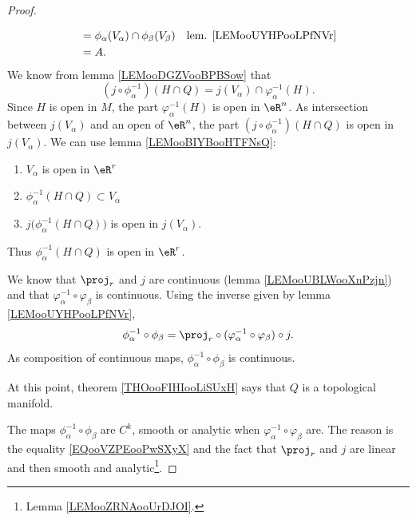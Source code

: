\begin{proof}
\begin{subproof}
\begin{subproof}
\begin{subequations}
\begin{align}
					        & =\phi_{\alpha}(V_{\alpha})\cap\phi_{\beta}(V_{\beta})                                                  & \text{lem. \ref{LEMooUYHPooLPfNVr}} \\
					        & =A.
				\end{align}
			\end{subequations}
			We know from lemma \ref{LEMooDGZVooBPBSow} that
			\begin{equation}
				(j\circ\phi_{\alpha}^{-1})(H\cap Q)=j(V_{\alpha})\cap\varphi_{\alpha}^{-1}(H).
			\end{equation}
			Since \( H\) is open in \( M\), the part \( \varphi_{\alpha}^{-1}(H)\) is open in \( \eR^n\). As intersection between \( j(V_{\alpha})\) and an open of \( \eR^n\), the part \( (j\circ\phi_{\alpha}^{-1})(H\cap Q)\) is open in \( j(V_{\alpha})\). We can use lemma \ref{LEMooBIYBooHTFNsQ}:
			\begin{enumerate}
				\item
				      \( V_{\alpha}\) is open in \( \eR^r\)
				\item
				      \( \phi_{\alpha}^{-1}(H\cap Q)\subset V_{\alpha}\)
				\item
				      \( j\big( \phi_{\alpha}^{-1}(H\cap Q) \big)\) is open in \( j(V_{\alpha})\).
			\end{enumerate}
			Thus \( \phi_{\alpha}^{-1}(H\cap Q)\) is open in \( \eR^r\).
		\end{subproof}

		We know that \( \proj_r\) and \( j\) are continuous (lemma \ref{LEMooUBLWooXnPzjn}) and that \(\varphi_{\alpha}^{-1}\circ\varphi_{\beta}\) is continuous. Using the inverse given by lemma \ref{LEMooUYHPooLPfNVr},
		\begin{equation}		\label{EQooVZPEooPwSXyX}
			\phi_{\alpha}^{-1}\circ\phi_{\beta}=\proj_r\circ(\varphi_{\alpha}^{-1}\circ\varphi_{\beta})\circ j.
		\end{equation}
		As composition of continuous maps, \( \phi_{\alpha}^{-1}\circ\phi_{\beta}\) is continuous.
	\end{subproof}
	At this point, theorem \ref{THOooFIHIooLiSUxH} says that \( Q\) is a topological manifold.

	The maps \( \phi_{\alpha}^{-1}\circ\phi_{\beta}\) are \( C^k\), smooth or analytic when \( \varphi_{\alpha}^{-1}\circ\varphi_{\beta}\) are. The reason is the equality \eqref{EQooVZPEooPwSXyX} and the fact that \( \proj_r\) and \( j\) are linear and then smooth and analytic\footnote{Lemma \ref{LEMooZRNAooUrDJOI}.}.
\end{proof}

